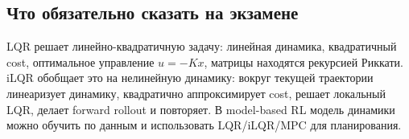 \documentclass[11pt,a4paper]{article}
\newcommand{\1}{\mathbf{1}}
\begin{document}
\subsection*{Что обязательно сказать на экзамене}
LQR решает линейно-квадратичную задачу: линейная динамика, квадратичный cost, оптимальное управление $u=-Kx$, матрицы находятся рекурсией Риккати. iLQR обобщает это на нелинейную динамику: вокруг текущей траектории линеаризует динамику, квадратично аппроксимирует cost, решает локальный LQR, делает forward rollout и повторяет. В model-based RL модель динамики можно обучить по данным и использовать LQR/iLQR/MPC для планирования.
\end{document}
